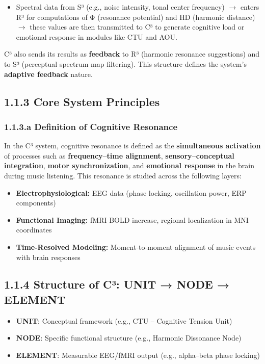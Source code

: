 \begin{itemize}
    \item Spectral data from S³ (e.g., noise intensity, tonal center frequency) $\rightarrow$ enters R³ for computations of Φ (resonance potential) and HD (harmonic distance) $\rightarrow$ these values are then transmitted to C³ to generate cognitive load or emotional response in modules like CTU and AOU.
\end{itemize}

C³ also sends its results as \textbf{feedback} to R³ (harmonic resonance suggestions) and to S³ (perceptual spectrum map filtering). This structure defines the system’s \textbf{adaptive feedback} nature.

\subsection*{1.1.3 Core System Principles}

\subsubsection*{1.1.3.a Definition of Cognitive Resonance}

In the C³ system, cognitive resonance is defined as the \textbf{simultaneous activation} of processes such as \textbf{frequency–time alignment}, \textbf{sensory–conceptual integration}, \textbf{motor synchronization}, and \textbf{emotional response} in the brain during music listening. This resonance is studied across the following layers:

\begin{itemize}
    \item \textbf{Electrophysiological:} EEG data (phase locking, oscillation power, ERP components)
    \item \textbf{Functional Imaging:} fMRI BOLD increase, regional localization in MNI coordinates
    \item \textbf{Time-Resolved Modeling:} Moment-to-moment alignment of music events with brain responses
\end{itemize}

\subsection*{1.1.4 Structure of C³: UNIT → NODE → ELEMENT}

\begin{itemize}
    \item \textbf{UNIT}: Conceptual framework (e.g., CTU – Cognitive Tension Unit)
    \item \textbf{NODE}: Specific functional structure (e.g., Harmonic Dissonance Node)
    \item \textbf{ELEMENT}: Measurable EEG/fMRI output (e.g., alpha–beta phase locking)
\end{itemize}

